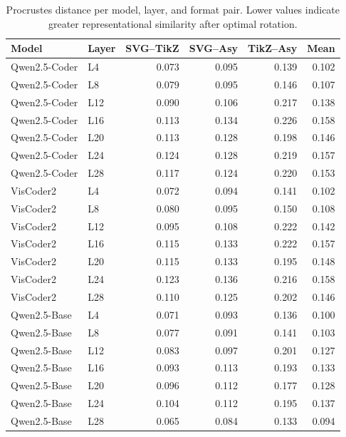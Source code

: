\begin{table}[t]
\centering
\caption{Procrustes distance per model, layer, and format pair.  Lower values indicate greater representational similarity after optimal rotation.}
\label{tab:procrustes_complete}
\small
\begin{tabular}{ll rrr r}
\toprule
\textbf{Model} & \textbf{Layer} & \textbf{SVG--TikZ} & \textbf{SVG--Asy} & \textbf{TikZ--Asy} & \textbf{Mean} \\
\midrule
Qwen2.5-Coder & L4  & 0.073 & 0.095 & 0.139 & 0.102 \\
Qwen2.5-Coder & L8  & 0.079 & 0.095 & 0.146 & 0.107 \\
Qwen2.5-Coder & L12 & 0.090 & 0.106 & 0.217 & 0.138 \\
Qwen2.5-Coder & L16 & 0.113 & 0.134 & 0.226 & 0.158 \\
Qwen2.5-Coder & L20 & 0.113 & 0.128 & 0.198 & 0.146 \\
Qwen2.5-Coder & L24 & 0.124 & 0.128 & 0.219 & 0.157 \\
Qwen2.5-Coder & L28 & 0.117 & 0.124 & 0.220 & 0.153 \\
\midrule
VisCoder2      & L4  & 0.072 & 0.094 & 0.141 & 0.102 \\
VisCoder2      & L8  & 0.080 & 0.095 & 0.150 & 0.108 \\
VisCoder2      & L12 & 0.095 & 0.108 & 0.222 & 0.142 \\
VisCoder2      & L16 & 0.115 & 0.133 & 0.222 & 0.157 \\
VisCoder2      & L20 & 0.115 & 0.133 & 0.195 & 0.148 \\
VisCoder2      & L24 & 0.123 & 0.136 & 0.216 & 0.158 \\
VisCoder2      & L28 & 0.110 & 0.125 & 0.202 & 0.146 \\
\midrule
Qwen2.5-Base   & L4  & 0.071 & 0.093 & 0.136 & 0.100 \\
Qwen2.5-Base   & L8  & 0.077 & 0.091 & 0.141 & 0.103 \\
Qwen2.5-Base   & L12 & 0.083 & 0.097 & 0.201 & 0.127 \\
Qwen2.5-Base   & L16 & 0.093 & 0.113 & 0.193 & 0.133 \\
Qwen2.5-Base   & L20 & 0.096 & 0.112 & 0.177 & 0.128 \\
Qwen2.5-Base   & L24 & 0.104 & 0.112 & 0.195 & 0.137 \\
Qwen2.5-Base   & L28 & 0.065 & 0.084 & 0.133 & 0.094 \\
\bottomrule
\end{tabular}
\end{table}

